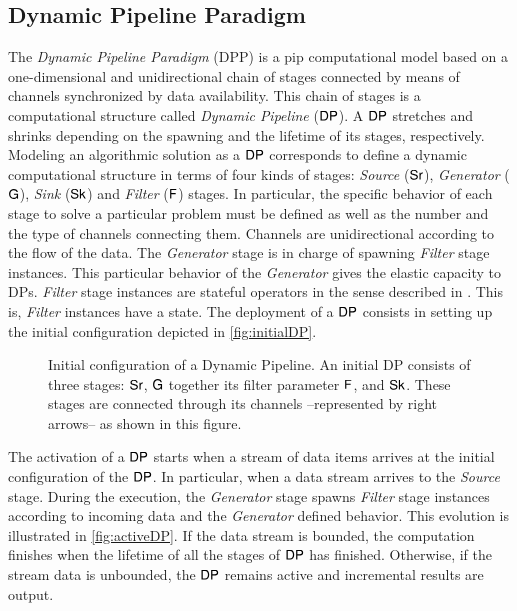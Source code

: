 \subsection{Dynamic Pipeline Paradigm}\label{sec:dp}
The \textit{Dynamic Pipeline Paradigm} (DPP) \cite{dpdef} is a \acrshort{pip} computational model based on a one-dimensional and unidirectional chain of stages connected by means of channels synchronized by data availability. 
This chain of stages is a computational structure called \textit{Dynamic Pipeline} ($\mathsf{DP}$). A $\mathsf{DP}$ stretches and shrinks depending on the spawning and the lifetime of its stages, respectively. Modeling an algorithmic 
solution as a $\mathsf{DP}$ corresponds to define a dynamic computational structure in terms of four kinds of stages: \textit{Source} ($\mathsf{Sr}$), \textit{Generator} ($\mathsf{G}$), \textit{Sink} ($\mathsf{Sk}$) and \textit{Filter} ($\mathsf{F}$) stages. 
In particular, the specific behavior of each stage to solve a particular problem must be defined as well as the number and the type of channels connecting them. Channels are unidirectional according to the flow of the data. 
The \textit{Generator} stage is in charge of spawning \textit{Filter} stage instances. This particular behavior of the \textit{Generator} gives the elastic capacity to DPs. \textit{Filter} stage instances are stateful operators in the 
sense described in \cite{hr19}. This is, \textit{Filter} instances have a state.  
The deployment of a $\mathsf{DP}$ consists in setting up the initial configuration depicted in \autoref{fig:initialDP}. 
\begin{wrapfigure}{r}{0.5\textwidth}
  \begin{center}
\end{center}
\caption[{[Pre] Inital DP Configuration}]{Initial configuration of a Dynamic Pipeline. An initial DP consists of three stages: $\mathsf{Sr}$, $\mathsf{G}$ together its filter parameter $\mathsf{F}$, and $\mathsf{Sk}$. These stages are connected through its channels --represented by right arrows-- as shown in this figure.}
\label{fig:initialDP}
\end{wrapfigure}
The activation of a $\mathsf{DP}$ starts when a stream of data items arrives at the initial configuration of the $\mathsf{DP}$. 
In particular, when a data stream arrives to the \textit{Source} stage. During the execution, the \textit{Generator} stage spawns \textit{Filter} stage instances according to incoming data and the \textit{Generator} defined behavior. 
This evolution is illustrated in  \autoref{fig:activeDP}. 
If the data stream is bounded, the computation finishes when the lifetime of all the stages of $\mathsf{DP}$ has finished. Otherwise, if the stream data is unbounded, 
the $\mathsf{DP}$ remains active and incremental results are output. 


